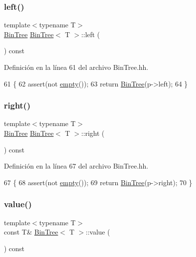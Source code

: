 \subsubsection{\texorpdfstring{left()}{left()}}
{\footnotesize\ttfamily template$<$typename T$>$ \\
\hyperlink{class_bin_tree}{Bin\+Tree} \hyperlink{class_bin_tree}{Bin\+Tree}$<$ T $>$\+::left (\begin{DoxyParamCaption}{ }\end{DoxyParamCaption}) const}



Definición en la línea 61 del archivo Bin\+Tree.\+hh.


\begin{DoxyCode}
61                           \{
62         assert(not \hyperlink{class_bin_tree_a74cda259ba5c25b8ee38ed4dc33e4fad}{empty}());
63         \textcolor{keywordflow}{return} \hyperlink{class_bin_tree_a47eef22d29cd023449d97c073c08e5b6}{BinTree}(p->left);
64     \}
\end{DoxyCode}
\mbox{\label{class_bin_tree_aff8e96651b27284c329667b5ad3e4d0b}} 
\subsubsection{\texorpdfstring{right()}{right()}}
{\footnotesize\ttfamily template$<$typename T$>$ \\
\hyperlink{class_bin_tree}{Bin\+Tree} \hyperlink{class_bin_tree}{Bin\+Tree}$<$ T $>$\+::right (\begin{DoxyParamCaption}{ }\end{DoxyParamCaption}) const}



Definición en la línea 67 del archivo Bin\+Tree.\+hh.


\begin{DoxyCode}
67                            \{
68         assert(not \hyperlink{class_bin_tree_a74cda259ba5c25b8ee38ed4dc33e4fad}{empty}());
69         \textcolor{keywordflow}{return} \hyperlink{class_bin_tree_a47eef22d29cd023449d97c073c08e5b6}{BinTree}(p->right);
70     \}
\end{DoxyCode}
\mbox{\label{class_bin_tree_a734e785b089c87b49187ee7c58edf5f3}} 
\subsubsection{\texorpdfstring{value()}{value()}}
{\footnotesize\ttfamily template$<$typename T$>$ \\
const T\& \hyperlink{class_bin_tree}{Bin\+Tree}$<$ T $>$\+::value (\begin{DoxyParamCaption}{ }\end{DoxyParamCaption}) const}



